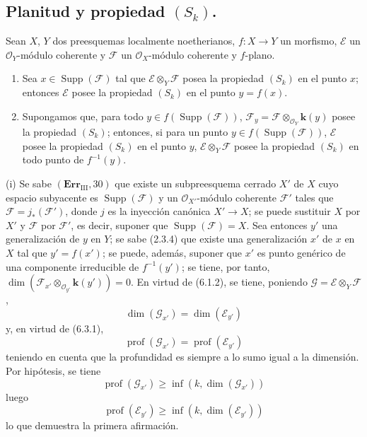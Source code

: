 \subsection{\texorpdfstring{Planitud y propiedad $(S_k)$.}{Planitud y propiedad (S\string_k)}}

\begin{proposition}[6.4.1]
\label{IV.2.s6.4.1-fr}
Sean $X$, $Y$ dos preesquemas localmente noetherianos, $f:X\to Y$ un
morfismo, $\mathscr E$ un $\mathcal O_Y$-módulo coherente y
$\mathscr F$ un $\mathcal O_X$-módulo coherente y $f$-plano.
\begin{enumerate}
\item[\textup{(i)}] Sea $x\in\operatorname{Supp}(\mathscr F)$ tal que
$\mathscr E\otimes_Y\mathscr F$ posea la propiedad $(S_k)$ en el punto $x$;
entonces $\mathscr E$ posee la propiedad $(S_k)$ en el punto $y=f(x)$.
\item[\textup{(ii)}] Supongamos que, para todo
$y\in f(\operatorname{Supp}(\mathscr F))$,
$\mathscr F_y=\mathscr F\otimes_{\mathcal O_Y}\boldsymbol{k}(y)$ posee la propiedad
$(S_k)$; entonces, si para un punto
$y\in f(\operatorname{Supp}(\mathscr F))$, $\mathscr E$ posee la propiedad
$(S_k)$ en el punto $y$, $\mathscr E\otimes_Y\mathscr F$ posee la propiedad
$(S_k)$ en todo punto de $f^{-1}(y)$.
\end{enumerate}
\end{proposition}

(i) Se sabe $(\mathbf{Err}_{\mathrm{III}},30)$ que existe un subpreesquema
cerrado $X'$ de $X$ cuyo espacio subyacente es
$\operatorname{Supp}(\mathscr F)$ y un $\mathcal O_{X'}$-módulo coherente
$\mathscr F'$ tales que $\mathscr F=j_*(\mathscr F')$, donde $j$ es la
inyección canónica $X'\to X$; se puede sustituir $X$ por $X'$ y $\mathscr F$
por $\mathscr F'$, es decir, suponer que
$\operatorname{Supp}(\mathscr F)=X$. Sea entonces $y'$ una generalización de
$y$ en $Y$; se sabe (2.3.4) que existe una generalización $x'$ de $x$ en $X$
tal que $y'=f(x')$; se puede, además, suponer que $x'$ es punto genérico de
una componente irreducible de $f^{-1}(y')$; se tiene, por tanto,
$\dim(\mathscr F_{x'}\otimes_{\mathcal O_{y'}}\boldsymbol{k}(y'))=0$. En virtud de (6.1.2),
se tiene, poniendo $\mathscr G=\mathscr E\otimes_Y\mathscr F$,
\[
\dim(\mathscr G_{x'})=\dim(\mathscr E_{y'})
\]
y, en virtud de (6.3.1),
\[
\operatorname{prof}(\mathscr G_{x'})=\operatorname{prof}(\mathscr E_{y'})
\]
teniendo en cuenta que la profundidad es siempre a lo sumo igual a la
dimensión. Por hipótesis, se tiene
\[
\operatorname{prof}(\mathscr G_{x'})
\geq\inf(k,\dim(\mathscr G_{x'}))
\]
luego
\[
\operatorname{prof}(\mathscr E_{y'})
\geq\inf(k,\dim(\mathscr E_{y'}))
\]
lo que demuestra la primera afirmación.

